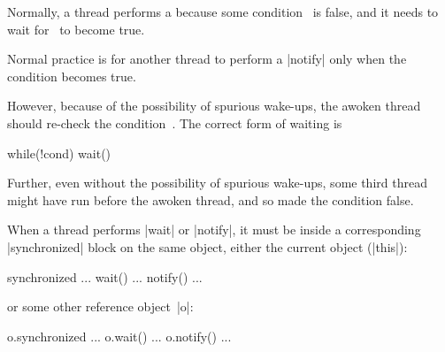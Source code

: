 
\begin{slide}

Normally, a thread performs a  because some condition~
is false, and it needs to wait for~ to become true.  

Normal practice is for another thread to perform a |notify| only when the
condition becomes true.

However, because of the possibility of spurious wake-ups, the awoken thread
should re-check the  condition~.  The correct form of waiting is
%
\begin{scala}
  while(!cond) wait()
\end{scala}

Further, even without the possibility of spurious wake-ups, some third thread
might have run before the awoken thread, and so made the condition false. 

\end{slide}


\begin{slide}

When a thread performs |wait| or |notify|, it must be inside a corresponding
|synchronized| block on the same object, either the current object (|this|):
\begin{scala}
synchronized{ ... wait() ... notify() ... }
\end{scala}
%
or some other reference object~|o|:
\begin{scala}
o.synchronized{ ... o.wait() ... o.notify() ... }
\end{scala}
\end{slide}


